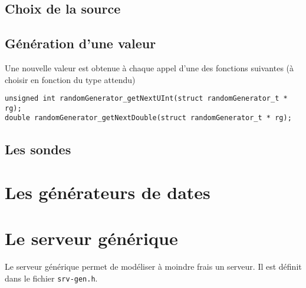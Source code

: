 \documentclass{article}
\begin{document}
\subsection{Choix de la source}

%
\subsection{Génération d'une valeur}


   Une nouvelle valeur est obtenue à chaque appel d'une des fonctions
suivantes (à choisir en fonction du type attendu)

\begin{verbatim}
unsigned int randomGenerator_getNextUInt(struct randomGenerator_t * rg);
double randomGenerator_getNextDouble(struct randomGenerator_t * rg);
\end{verbatim}

%
\subsection{Les sondes}

%
\section{Les générateurs de dates}
\label{section:date-gen}

%
\section{Le serveur générique}
\label{section:srv_gen}

   Le serveur générique permet de modéliser à moindre frais un
serveur. Il est définit dans le fichier {\tt srv-gen.h}.

%
\end{document}
